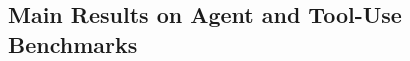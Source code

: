 \documentclass{article}
\begin{document}


%
%
\subsection{Main Results on Agent and Tool-Use Benchmarks}
\label{sec:exp:main}
\end{document}
